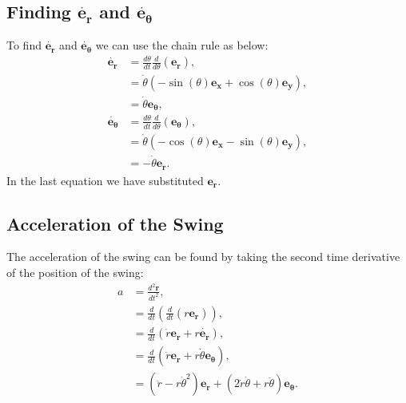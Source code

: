 \documentclass[12pt]{article}
\begin{document}
\subsection{Finding $\dot{\mathbf{e_r}}$ and $\dot{\mathbf{e_\theta}}$}
To find $\dot{\mathbf{e_r}}$ and $\dot{\mathbf{e_\theta}}$ we can use the chain rule as below:
\begin{align}
    \dot{\mathbf{e_r}} &= \frac{d\theta}{dt} \frac{d}{d\theta}(\mathbf{e_r}),\\
    &= \dot{\theta}(-\sin(\theta) \mathbf{e_x} + \cos(\theta) \mathbf{e_y}),\\
    &= \dot{\theta}\mathbf{e_\theta},\\
    \dot{\mathbf{e_\theta}} &= \frac{d\theta}{dt} \frac{d}{d\theta}(\mathbf{e_\theta}),\\
    &= \dot{\theta} (-\cos(\theta) \mathbf{e_x} - \sin(\theta) \mathbf{e_y}),\\
    &= -\dot{\theta} \mathbf{e_r}.
\end{align}
In the last equation we have substituted $\mathbf{e_r}$.
\subsection{Acceleration of the Swing}
The acceleration of the swing can be found by taking the second time derivative of the position of the swing:
\begin{align}
    a &= \frac{d^2\mathbf{r}}{dt^2},\\
    &= \frac{d}{dt}(\frac{d}{dt}(r\mathbf{e_r})),\\
    &= \frac{d}{dt}(\dot{r} \mathbf{e_r} + r\mathbf{\dot{e_r}}),\\
    &= \frac{d}{dt}(\dot{r} \mathbf{e_r} + r\dot{\theta}\mathbf{e_\theta}),\\
    &= (\ddot{r} - r \dot{\theta}^2) \mathbf{e_r} + (2\dot{r} \dot{\theta} + r \ddot{\theta}) \mathbf{e_\theta}.
\end{align}
\end{document}
